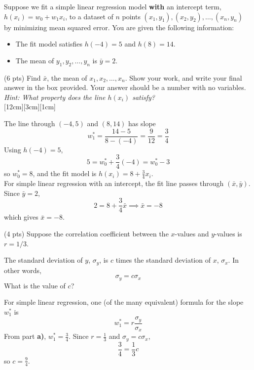\documentclass[11pt]{article}
\begin{document}
\begin{prob}[(14 pts)]
Suppose we fit a simple linear regression model \textbf{with} an intercept term, $h(x_i)=w_0+w_1x_i$,
to a dataset of $n$ points $(x_1, y_1), (x_2, y_2), \ldots, (x_n, y_n)$ by minimizing mean squared error. You are given the following information:

\begin{itemize}
    \item The fit model satisfies $h(-4) = 5$ and $h(8) = 14$.
    \item The mean of $y_1, y_2, \ldots, y_n$ is $\bar y = 2$.
\end{itemize}

\begin{subprob}(6 pts) Find $\bar x$, the mean of $x_1, x_2, \ldots, x_n$. Show your work, and write your final answer in the box provided. Your answer should be a number with no variables. \textit{Hint: What property does the line $h(x_i)$ satisfy?} \\

[12cm][3cm][1cm]

\begin{solution}
The line through $(-4,5)$ and $(8,14)$ has slope
\[
w_1^*=\frac{14-5}{8-(-4)}=\frac{9}{12}=\frac34
\]
Using $h(-4)=5$,
\[
5=w_0^*+\frac34(-4)=w_0^*-3
\]
so $w_0^*=8$, and the fit model is $h(x_i) = 8 + \frac{3}{4}x_i$. \\

For simple linear regression with an intercept, the fit line passes through $(\bar x,\bar y)$. Since $\bar y=2$,
\[
2=8+\frac34\bar x \implies \bar x = -8
\]
which gives $\boxed{\bar x=-8}$.
\end{solution}
\end{subprob}

\begin{subprob}(4 pts) Suppose the correlation coefficient between the $x$-values and $y$-values is $r = 1/3$.

The standard deviation of $y$, $\sigma_y$, is $c$ times the standard deviation of $x$, $\sigma_x$. In other words, $$\sigma_y = c \sigma_x$$ What is the value of $c$?

     
\begin{solution}
For simple linear regression, one (of the many equivalent) formula for the slope $w_1^*$ is
\[
w_1^*=r\frac{\sigma_y}{\sigma_x}
\]
From part \textbf{a)}, $w_1^*=\frac34$. Since $r=\frac13$ and $\sigma_y=c\sigma_x$,
\[
\frac34=\frac13c
\]
so $\boxed{c=\frac94}$.
\end{solution}
\end{subprob}


\end{prob}
\end{document}
